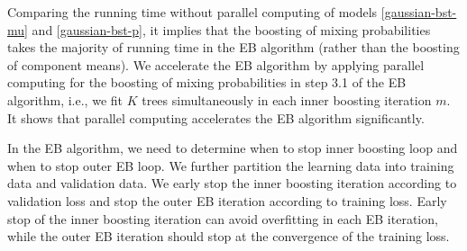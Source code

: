 \documentclass[11pt]{article}
\numberwithin{equation}{section}
\begin{document}
Comparing the running time without parallel computing of models \eqref{gaussian-bst-mu} and \eqref{gaussian-bst-p}, it implies that the boosting of mixing probabilities takes the majority of running time in the EB algorithm (rather than the boosting of component means).
We accelerate the EB algorithm by applying parallel computing for the boosting of mixing probabilities in step 3.1 of the EB algorithm, i.e., we fit $K$ trees  simultaneously in each inner boosting iteration $m$.
It shows that parallel computing accelerates the EB algorithm significantly.   


In the EB algorithm, we need to determine when to stop inner boosting loop and when to stop outer EB loop.
We further partition the learning data into training data and validation data. 
We early stop the inner boosting iteration according to validation loss and stop the outer EB iteration according to training loss. Early stop of the inner boosting iteration can avoid overfitting in each EB iteration, while the outer EB iteration should stop at the convergence of the training loss.
\end{document}
